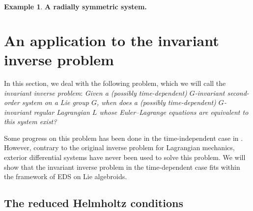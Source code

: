 \documentclass[11pt]{article}
\theoremstyle{plain}
\theoremstyle{definition}
\newtheorem{example}{Example}
\begin{document}
\begin{example} {\bf A radially symmetric system.}






\end{example}


\section{An application to the invariant inverse problem}\label{sec:invariantinverse}
In this section, we deal with the following problem, which we will call the \emph{invariant inverse problem}: \emph{Given a (possibly time-dependent) $G$-invariant second-order system on a Lie group $G$, when does a (possibly time-dependent) $G$-invariant regular Lagrangian $L$ whose Euler--Lagrange equations are equivalent to this system exist?}

Some progress on this problem has been done in the time-independent case in \cite{barbero2016invproblemliealgebroids,crampin2008invariantinv,muzsnay2005invariantinv}. However, contrary to the original inverse problem for Lagrangian mechanics, exterior differential systems have never been used to solve this problem. We will show that the invariant inverse problem in the time-dependent case fits within the framework of EDS on Lie algebroids.

\subsection{The reduced Helmholtz conditions}
\end{document}
